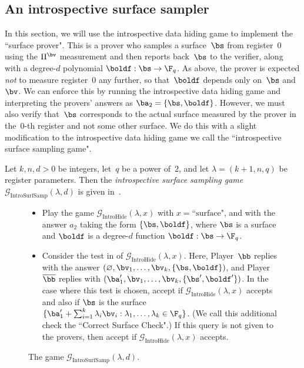 \documentclass[11pt]{article}
\newcommand{\game}{\mathscr{G}}
\begin{document}
\subsection{An introspective surface sampler}

In this section, we will use the introspective data hiding game
to implement the ``surface prover".
This is a prover who samples a surface~$\bs$ from register~$0$ using the $\Pi^{\bv}$ measurement
and then reports back~$\bs$ to the verifier, along with a degree-$d$ polynomial $\boldf:\bs \rightarrow \F_q$.
As above, the prover is expected \emph{not} to measure register~$0$ any further, so that~$\boldf$ depends only on~$\bs$ and~$\bv$.
We can enforce this by running the introspective data hiding game and interpreting the provers' answers as $\ba_2 = \{\bs, \boldf\}$.
However, we must also verify that~$\bs$ corresponds to the actual surface measured by the prover in the~$0$-th register
and not some other surface.
We do this with a slight modification to the introspective data hiding game we call the ``introspective surface sampling game".

\begin{definition}
Let $k, n, d>0$ be integers, let~$q$ be a power of~$2$,
and let $\lambda = (k+1, n, q)$ be register parameters.
Then the \emph{introspective surface sampling game}~$\game_{\mathrm{IntroSurfSamp}}(\lambda, d)$ is given in~.
\end{definition}

{
\begin{figure}[htbp]
  \begin{itemize}
  \item[$\circ$] Play the game $\game_{\mathrm{IntroHide}}(\lambda, x)$ with $x =
    \text{``surface"}$, and with the answer $a_2$ taking the form
    $\{\bs,\boldf\}$, where $\bs$ is a surface and
                  $\boldf$ is a degree-$d$ function $\boldf:\bs\rightarrow \F_q$.
  \item[$\circ$] Consider the test in  of $\game_{\mathrm{IntroHide}}(\lambda, x)$.
  	Here, Player~$\bb$ replies with the answer
		$(\varnothing, \bv_1, \ldots, \bv_k, \{\bs, \boldf\})$,
		and Player~$\overline{\bb}$ replies with
		$(\ba_1', \bv_1, \ldots, \bv_k, \{\bs', \boldf'\})$.
   In the case where this test is chosen, accept if $\game_{\mathrm{IntroHide}}(\lambda, x)$ accepts and also if
   $\bs$ is the surface $\{\ba_1' +
    \sum_{i=1}^{k} \lambda_i \bv_i : \lambda_1,
    \dots, \lambda_k \in \F_q\}$.
    (We call this additional check the ``Correct Surface Check".)
    If this query is not given to the
    provers, then accept if $\game_{\mathrm{IntroHide}}(\lambda, x)$ accepts.
  \end{itemize}
  \caption{The game $\game_{\mathrm{IntroSurfSamp}}(\lambda,d)$.\label{fig:big-plane}}
\end{figure}
}
\end{document}
